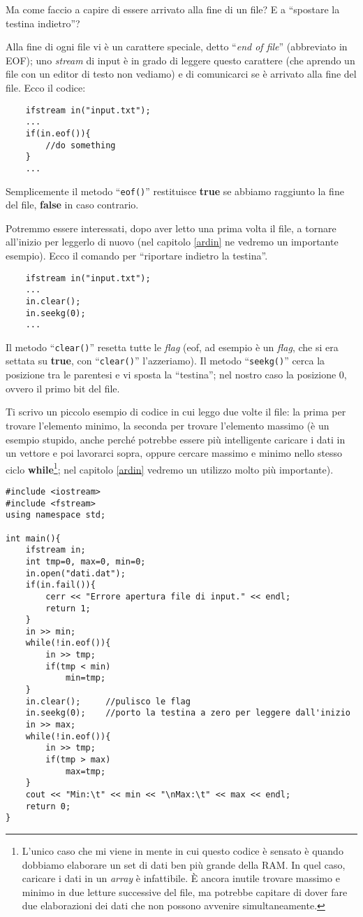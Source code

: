Ma come faccio a capire di essere arrivato alla fine di un file? E a ``spostare la testina indietro''?

Alla fine di ogni file vi è un carattere speciale, detto ``\emph{end of file}'' (abbreviato in EOF); uno \emph{stream} di input è in grado di leggere questo carattere (che aprendo un file con un editor di testo non vediamo) e di comunicarci se è arrivato alla fine del file. Ecco il codice:
\begin{lstlisting}
	ifstream in("input.txt");
	...
	if(in.eof()){
		//do something
	}
	...
\end{lstlisting}

Semplicemente il metodo ``\verb|eof()|'' restituisce \textbf{true} se abbiamo raggiunto la fine del file, \textbf{false} in caso contrario.

Potremmo essere interessati, dopo aver letto una prima volta il file, a tornare all'inizio per leggerlo di nuovo (nel capitolo \ref{ardin} ne vedremo un importante esempio). Ecco il comando per ``riportare indietro la testina''. 
\begin{lstlisting}
	ifstream in("input.txt");
	...
	in.clear(); 
	in.seekg(0);
	...
\end{lstlisting}

Il metodo ``\verb|clear()|'' resetta tutte le \emph{flag} (eof, ad esempio è un \emph{flag}, che si era settata su \textbf{true}, con ``\verb|clear()|'' l'azzeriamo). Il metodo ``\verb|seekg()|'' cerca la posizione tra le parentesi e vi sposta la ``testina''; nel nostro caso la posizione 0, ovvero il primo bit del file.

Ti scrivo un piccolo esempio di codice in cui leggo due volte il file: la prima per trovare l'elemento minimo, la seconda  per trovare l'elemento massimo (è un esempio stupido, anche perché potrebbe essere più intelligente caricare i dati in un vettore e poi lavorarci sopra, oppure cercare massimo e minimo nello stesso ciclo \textbf{while}\footnote{L'unico caso che mi viene in mente in cui questo codice è sensato è quando dobbiamo elaborare un set di dati ben più grande della RAM. In quel caso, caricare i dati in un \emph{array} è infattibile. È ancora inutile trovare massimo e minimo in due letture successive del file, ma potrebbe capitare di dover fare due elaborazioni dei dati che non possono avvenire simultaneamente.}; nel capitolo \ref{ardin} vedremo un utilizzo molto più importante). 
\begin{lstlisting}
#include <iostream>
#include <fstream>
using namespace std;

int main(){
	ifstream in; 
	int tmp=0, max=0, min=0;
	in.open("dati.dat");
	if(in.fail()){
		cerr << "Errore apertura file di input." << endl;
		return 1;
	}   
	in >> min;
	while(!in.eof()){
		in >> tmp;
		if(tmp < min)
			min=tmp;
	}   
	in.clear();     //pulisco le flag
	in.seekg(0);    //porto la testina a zero per leggere dall'inizio       
	in >> max;
	while(!in.eof()){
		in >> tmp;
		if(tmp > max)
			max=tmp;
	}   
	cout << "Min:\t" << min << "\nMax:\t" << max << endl;
	return 0;
}    

\end{lstlisting}

